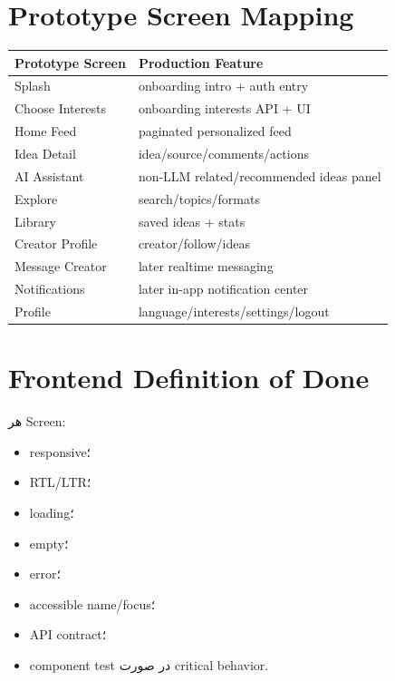 \section{Prototype Screen Mapping}

\begin{longtable}{p{4cm}p{8.5cm}}
\toprule
\textbf{Prototype Screen} & \textbf{Production Feature} \\
\midrule
Splash & onboarding intro + auth entry \\
Choose Interests & onboarding interests API + UI \\
Home Feed & paginated personalized feed \\
Idea Detail & idea/source/comments/actions \\
AI Assistant & non-LLM related/recommended ideas panel \\
Explore & search/topics/formats \\
Library & saved ideas + stats \\
Creator Profile & creator/follow/ideas \\
Message Creator & later realtime messaging \\
Notifications & later in-app notification center \\
Profile & language/interests/settings/logout \\
\bottomrule
\end{longtable}

\section{Frontend Definition of Done}

هر Screen:
\begin{itemize}
  \item responsive؛
  \item RTL/LTR؛
  \item loading؛
  \item empty؛
  \item error؛
  \item accessible name/focus؛
  \item API contract؛
  \item component test در صورت critical behavior.
\end{itemize}
